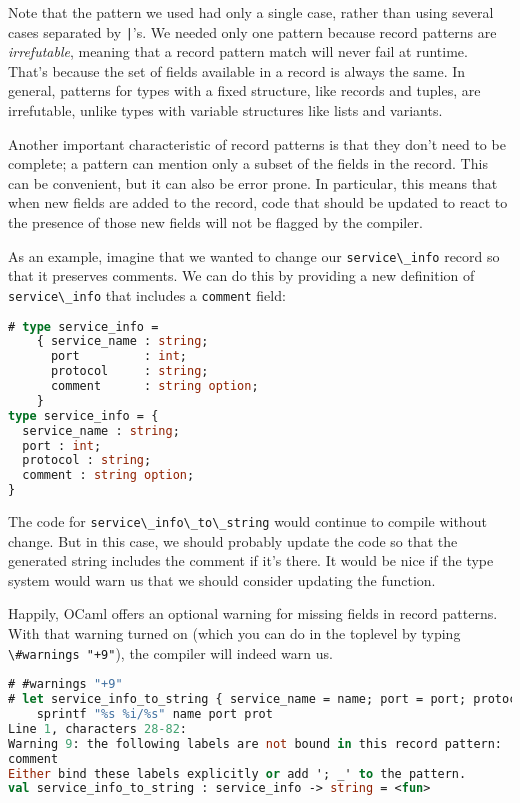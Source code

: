 Note that the pattern we used had only a single case, rather than using
several cases separated by \passthrough{\lstinline!|!}'s. We needed only
one pattern because record patterns are \emph{irrefutable}, meaning that
a record pattern match will never fail at runtime. That's because the
set of fields available in a record is always the same. In general,
patterns for types with a fixed structure, like records and tuples, are
irrefutable, unlike types with variable structures like lists and
variants.

Another important characteristic of record patterns is that they don't
need to be complete; a pattern can mention only a subset of the fields
in the record. This can be convenient, but it can also be error prone.
In particular, this means that when new fields are added to the record,
code that should be updated to react to the presence of those new fields
will not be flagged by the compiler.

As an example, imagine that we wanted to change our
\passthrough{\lstinline!service\_info!} record so that it preserves
comments. We can do this by providing a new definition of
\passthrough{\lstinline!service\_info!} that includes a
\passthrough{\lstinline!comment!} field:

\begin{lstlisting}[language=Caml]
# type service_info =
    { service_name : string;
      port         : int;
      protocol     : string;
      comment      : string option;
    }
type service_info = {
  service_name : string;
  port : int;
  protocol : string;
  comment : string option;
}
\end{lstlisting}

The code for \passthrough{\lstinline!service\_info\_to\_string!} would
continue to compile without change. But in this case, we should probably
update the code so that the generated string includes the comment if
it's there. It would be nice if the type system would warn us that we
should consider updating the function.

Happily, OCaml offers an optional warning for missing fields in record
patterns. With that warning turned on (which you can do in the toplevel
by typing \passthrough{\lstinline!\#warnings "+9"!}), the compiler will
indeed warn
us.

\begin{lstlisting}[language=Caml]
# #warnings "+9"
# let service_info_to_string { service_name = name; port = port; protocol = prot  } =
    sprintf "%s %i/%s" name port prot
Line 1, characters 28-82:
Warning 9: the following labels are not bound in this record pattern:
comment
Either bind these labels explicitly or add '; _' to the pattern.
val service_info_to_string : service_info -> string = <fun>
\end{lstlisting}


